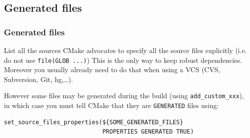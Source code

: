 \documentclass[compress,slidestop,table
              ]
               {beamer}
\begin{document}
\subsection{Generated files}
\begin{frame}[fragile]
\frametitle{Generated files}
\begin{block}{List all the sources}
CMake advocates to specify all the source files explicitly
(i.e. do not use \lstinline!file(GLOB ...)!)
This is the only way to keep robust dependencies.
Moreover you usually already need to do that when using a VCS
(CVS, Subversion, Git, hg,\ldots).
\end{block}
However some files may be generated during the build (using \lstinline!add_custom_xxx!),
in which case you must tell CMake that they are \lstinline!GENERATED! files
using:

\begin{lstlisting}[basicstyle=\scriptsize]
set_source_files_properties(${SOME_GENERATED_FILES}
                            PROPERTIES GENERATED TRUE)
\end{lstlisting}
\end{frame}

\end{document}
